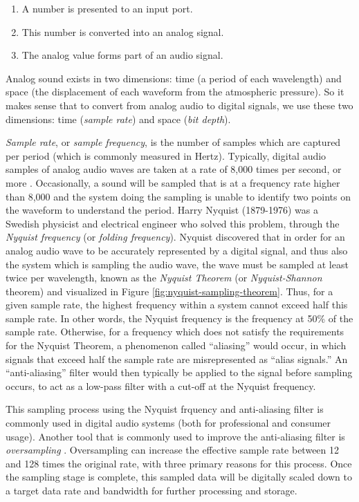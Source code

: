 \begin{enumerate}
	\item A number is presented to an input port.
	\item This number is converted into an analog signal.
	\item The analog value forms part of an audio signal.
\end{enumerate}

Analog sound exists in two dimensions: time (a period of each wavelength) and space (the displacement of each waveform from the atmospheric pressure). So it makes sense that to convert from analog audio to digital signals, we use these two dimensions: time (\textit{sample rate}) and space (\textit{bit depth}). 

\textit{Sample rate}, or \textit{sample frequency}, is the number of samples which are captured per period (which is commonly measured in Hertz). Typically, digital audio samples of analog audio waves are taken at a rate of 8,000 times per second, or more \cite{Zjalic_2021}. Occasionally, a sound will be sampled that is at a frequency rate higher than 8,000 and the system doing the sampling is unable to identify two points on the waveform to understand the period. Harry Nyquist (1879-1976) was a Swedish physicist and electrical engineer who solved this problem, through the \textit{Nyquist frequency} (or \textit{folding frequency}). Nyquist discovered that in order for an analog audio wave to be accurately represented by a digital signal, and thus also the system which is sampling the audio wave, the wave must be sampled at least twice per wavelength, known as the \textit{Nyquist Theorem} (or \textit{Nyquist-Shannon} theorem) \cite{Zjalic_2021} and visualized in Figure \ref{fig:nyquist-sampling-theorem}. Thus, for a given sample rate, the highest frequency within a system cannot exceed half this sample rate. In other words, the Nyquist frequency is the frequency at 50\% of the sample rate. Otherwise, for a frequency which does not satisfy the requirements for the Nyquist Theorem, a phenomenon called ``aliasing'' would occur, in which signals that exceed half the sample rate are misrepresented as ``alias signals.'' An ``anti-aliasing'' filter would then typically be applied to the signal before sampling occurs, to act as a low-pass filter with a cut-off at the Nyquist frequency. 

This sampling process using the Nyquist frquency and anti-aliasing filter is commonly used in digital audio systems (both for professional and consumer usage). Another tool that is commonly used to improve the anti-aliasing filter is \textit{oversampling} \cite{Huber_Runstein_2018}. Oversampling can increase the effective sample rate between 12 and 128 times the original rate, with three primary reasons for this process. Once the sampling stage is complete, this sampled data will be digitally scaled down to a target data rate and bandwidth for further processing and storage.

